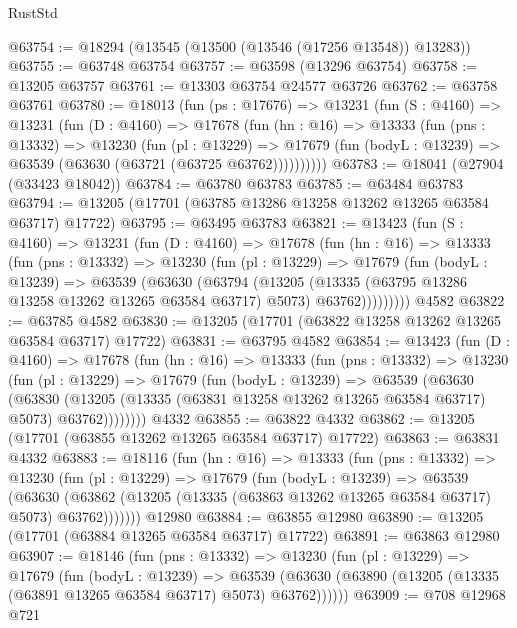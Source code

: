 \begin{lexlean}{RustStd}
\begin{coremodule}
@63754 := @18294 (@13545 (@13500 (@13546 (@17256 @13548)) @13283))
@63755 := @63748 @63754
@63757 := @63598 (@13296 @63754)
@63758 := @13205 @63757
@63761 := @13303 @63754 @24577 @63726
@63762 := @63758 @63761
@63780 := @18013
    (fun (ps : @17676) =>
    @13231
      (fun (S : @4160) =>
      @13231
        (fun (D : @4160) =>
        @17678
          (fun (hn : @16) =>
          @13333
            (fun (pns : @13332) =>
            @13230
              (fun (pl : @13229) =>
              @17679 (fun (bodyL : @13239) => @63539 (@63630 (@63721 (@63725 @63762))))))))))
@63783 := @18041 (@27904 (@33423 @18042))
@63784 := @63780 @63783
@63785 := @63484 @63783
@63794 := @13205 (@17701 (@63785 @13286 @13258 @13262 @13265 @63584 @63717) @17722)
@63795 := @63495 @63783
@63821 := @13423
    (fun (S : @4160) =>
    @13231
      (fun (D : @4160) =>
      @17678
        (fun (hn : @16) =>
        @13333
          (fun (pns : @13332) =>
          @13230
            (fun (pl : @13229) =>
            @17679
              (fun (bodyL : @13239) =>
              @63539
                (@63630
                  (@63794
                    (@13205
                      (@13335 (@63795 @13286 @13258 @13262 @13265 @63584 @63717) @5073)
                      @63762)))))))))
    @4582
@63822 := @63785 @4582
@63830 := @13205 (@17701 (@63822 @13258 @13262 @13265 @63584 @63717) @17722)
@63831 := @63795 @4582
@63854 := @13423
    (fun (D : @4160) =>
    @17678
      (fun (hn : @16) =>
      @13333
        (fun (pns : @13332) =>
        @13230
          (fun (pl : @13229) =>
          @17679
            (fun (bodyL : @13239) =>
            @63539
              (@63630
                (@63830
                  (@13205 (@13335 (@63831 @13258 @13262 @13265 @63584 @63717) @5073) @63762))))))))
    @4332
@63855 := @63822 @4332
@63862 := @13205 (@17701 (@63855 @13262 @13265 @63584 @63717) @17722)
@63863 := @63831 @4332
@63883 := @18116
    (fun (hn : @16) =>
    @13333
      (fun (pns : @13332) =>
      @13230
        (fun (pl : @13229) =>
        @17679
          (fun (bodyL : @13239) =>
          @63539
            (@63630
              (@63862 (@13205 (@13335 (@63863 @13262 @13265 @63584 @63717) @5073) @63762)))))))
    @12980
@63884 := @63855 @12980
@63890 := @13205 (@17701 (@63884 @13265 @63584 @63717) @17722)
@63891 := @63863 @12980
@63907 := @18146
    (fun (pns : @13332) =>
    @13230
      (fun (pl : @13229) =>
      @17679
        (fun (bodyL : @13239) =>
        @63539 (@63630 (@63890 (@13205 (@13335 (@63891 @13265 @63584 @63717) @5073) @63762))))))
@63909 := @708 @12968 @721

\end{coremodule}
\end{lexlean}
